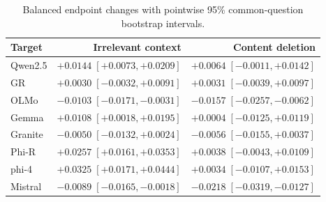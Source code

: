 \begin{table}[ht]
\caption{Balanced endpoint changes with pointwise 95\% common-question bootstrap intervals.}
\label{tab:endpoints-full}\centering\small
\begin{tabular}{lrr}\toprule
Target & Irrelevant context & Content deletion\\\midrule
Qwen2.5 & $+0.0144\;[+0.0073,+0.0209]$ & $+0.0064\;[-0.0011,+0.0142]$\\
GR & $+0.0030\;[-0.0032,+0.0091]$ & $+0.0031\;[-0.0039,+0.0097]$\\
OLMo & $-0.0103\;[-0.0171,-0.0031]$ & $-0.0157\;[-0.0257,-0.0062]$\\
Gemma & $+0.0108\;[+0.0018,+0.0195]$ & $+0.0004\;[-0.0125,+0.0119]$\\
Granite & $-0.0050\;[-0.0132,+0.0024]$ & $-0.0056\;[-0.0155,+0.0037]$\\
Phi-R & $+0.0257\;[+0.0161,+0.0353]$ & $+0.0038\;[-0.0043,+0.0109]$\\
phi-4 & $+0.0325\;[+0.0171,+0.0444]$ & $+0.0034\;[-0.0107,+0.0153]$\\
Mistral & $-0.0089\;[-0.0165,-0.0018]$ & $-0.0218\;[-0.0319,-0.0127]$\\
\bottomrule\end{tabular}\end{table}